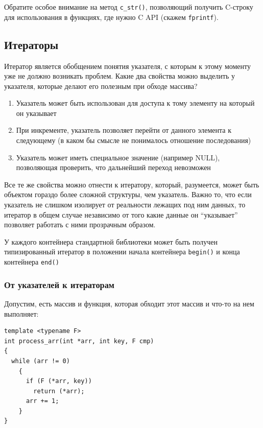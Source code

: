 \documentclass[a4paper,12pt,oneside]{article}
\begin{document}
Обратите особое внимание на метод \lstinline!c_str()!, позволяющий получить C-строку для использования в функциях, где нужно C API (скажем \lstinline!fprintf!).

\subsection{Итераторы}

Итератор является обобщением понятия указателя, с которым к этому моменту уже не должно возникать проблем. Какие два свойства можно выделить у указателя, которые делают его полезным при обходе массива?

\begin{enumerate}
\item Указатель может быть использован для доступа к тому элементу на который он указывает
\item При инкременте, указатель позволяет перейти от данного элемента к следующему (в каком бы смысле не понималось отношение последования)
\item Указатель может иметь специальное значение (например NULL), позволяющая проверить, что дальнейший переход невозможен
\end{enumerate}

Все те же свойства можно отнести к итератору, который, разумеется, может быть объектом гораздо более сложной структуры, чем указатель. Важно то, что если указатель не слишком изолирует от реальности лежащих под ним данных, то итератор в общем случае независимо от того какие данные он ``указывает'' позволяет работать с ними прозрачным образом.

У каждого контейнера стандартной библиотеки может быть получен типизированный итератор в положении начала контейнера \lstinline!begin()! и конца контейнера \lstinline!end()!

\subsubsection{От указателей к итераторам}\label{PointersToIterators}

Допустим, есть массив и функция, которая обходит этот массив и что-то на нем выполняет:

\begin{lstlisting}
template <typename F>
int process_arr(int *arr, int key, F cmp)
{
  while (arr != 0)
    {
      if (F (*arr, key)) 
        return (*arr);
      arr += 1; 
    }  
}
\end{lstlisting}
\end{document}
